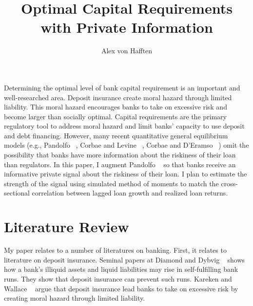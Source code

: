 \documentclass[12pt]{article}
\title{Optimal Capital Requirements with Private Information}
\author{Alex von Hafften}
\begin{document}
\maketitle

\doublespacing

Determining the optimal level of bank capital requirement is an important and well-researched area.  Deposit insurance create moral hazard through limited liability. This moral hazard encourages banks to take on excessive risk and become larger than socially optimal.  Capital requirements are the primary regulatory tool to address moral hazard and limit banks' capacity to use deposit and debt financing.  However, many recent quantitative general equilibrium models (e.g., Pandolfo ~\cite{pandolfo_2021}, Corbae and Levine ~\cite{corbae_levine_2022}, Corbae and D'Eramso ~\cite{corbae_derasmo_2021}) omit the possibility that banks have more information about the riskiness of their loan than regulators.  In this paper, I augment Pandolfo ~\cite{pandolfo_2021} so that banks receive an informative private signal about the riskiness of their loan.  I plan to estimate the strength of the signal using simulated method of moments to match the cross-sectional correlation between lagged loan growth and realized loan returns.

\section{Literature Review}

My paper relates to a number of literatures on banking.  First, it relates to literature on deposit insurance.  Seminal papers at Diamond and Dybvig ~\cite{diamond_dybvig_1983} shows how a bank's illiquid assets and liquid liabilities may rise in self-fulfilling bank runs. They show that deposit insurance can prevent such runs.  Kareken and Wallace ~\cite{kareken_wallace_1978} argue that deposit insurance lead banks to take on excessive risk by creating moral hazard through limited liability.  

\pagebreak
\end{document}
